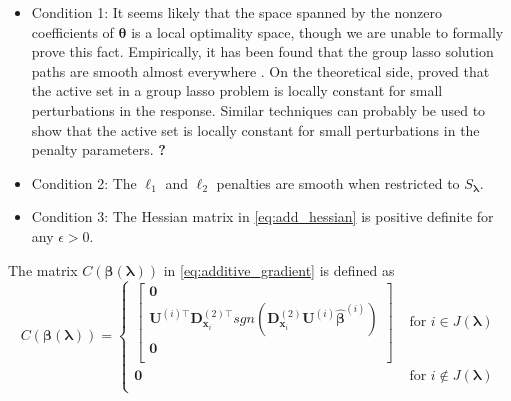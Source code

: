 \documentclass[12pt,letterpaper]{article}
\begin{document}
\begin{itemize}
	\item[] Condition 1: It seems likely that the space spanned by the nonzero coefficients of $\boldsymbol{\theta}$ is a local optimality space, though we are unable to formally prove this fact. Empirically, it has been found that the group lasso solution paths are smooth almost everywhere \citep{yuan2006model}. On the theoretical side, \citet{vaiter2012degrees} proved that the active set in a group lasso problem is locally constant for small perturbations in the response. Similar techniques can probably be used to show that the active set is locally constant for small perturbations in the penalty parameters.
	\hfill {}\textbf{?}
	\item[] Condition 2: The $\ell_1$ and $\ell_2$ penalties are smooth when restricted to $S_{\boldsymbol{\lambda}}$.\hfill {}
	\item[] Condition 3: The Hessian matrix in \eqref{eq:add_hessian} is positive definite for any $\epsilon > 0$. \hfill {}
\end{itemize}

The matrix $C(\boldsymbol \beta( \boldsymbol \lambda))$ in \eqref{eq:additive_gradient} is defined as
\begin{equation}
C(\boldsymbol \beta( \boldsymbol \lambda))
= \begin{cases}
\begin{bmatrix}
\boldsymbol{0} \\
\boldsymbol {U}^{(i)\top}  \boldsymbol{D}^{(2)\top}_{\boldsymbol{x}_i} 
sgn( \boldsymbol{D}^{(2)}_{\boldsymbol{x}_i} \boldsymbol {U}^{(i)} \hat{\boldsymbol{\beta}}^{(i)}) \\
\boldsymbol{0} \\
\end{bmatrix}
& \text{ for } i \in J(\boldsymbol \lambda) \\
\boldsymbol{0}
& \text{ for } i \not\in J(\boldsymbol \lambda) \\
\end{cases}
\end{equation}
\end{document}
